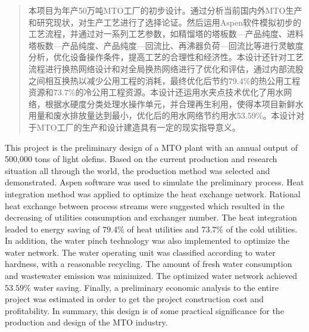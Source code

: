 
\begin{abstract}
本项目为年产50万吨MTO工厂的初步设计。通过分析当前国内外MTO生产和研究现状，对生产工艺进行了选择论证。然后运用Aspen软件模拟初步的工艺流程，并通过对一系列工艺参数，如精馏塔的塔板数—产品纯度、进料塔板数—产品纯度、产品纯度—回流比、再沸器负荷—回流比等进行灵敏度分析，优化设备操作条件，提高工艺的合理性和经济性。本设计还针对工艺流程进行换热网络设计和对全局换热网络进行了优化和评估，通过内部流股之间相互换热以减少公用工程的消耗，最终优化后节约$79.4\%$的热公用工程资源和$73.7\%$的冷公用工程资源。本设计还运用水夹点技术优化了用水网络，根据水硬度分类处理水操作单元，并合理再生利用，使得本项目新鲜水用量和废水排放量达到最小，优化后的用水网络节约用水$53.59\%$。本设计对于MTO工厂的生产和设计建造具有一定的现实指导意义。\\

\end{abstract}

\begin{englishabstract}

This project is the preliminary design of a MTO plant with an annual output of 500,000 tons of light olefins. Based on the current production and research situation all through the world, the production method was selected and demonstrated. Aspen software was used to simulate the preliminary process. Heat integration method was applied to optimize the heat exchange network. Rational heat exchange between process streams were suggested which resulted in the decreasing of utilities consumption and exchanger number. The heat integration leaded to energy saving of $79.4\%$ of heat utilities and $73.7\%$ of the cold utilities. In addition, the water pinch technology was also implemented to optimize the water network. The water operating unit was classified according to water hardness, with a reasonable recycling. The amount of fresh water consumption and wastewater emission was minimized. The optimized water network achieved $53.59\%$ water saving. Finally, a preliminary economic analysis to the entire project was estimated in order to get the project construction cost and profitability. In summary, this design is of some practical significance for the production and design of the MTO industry.

\end{englishabstract}

